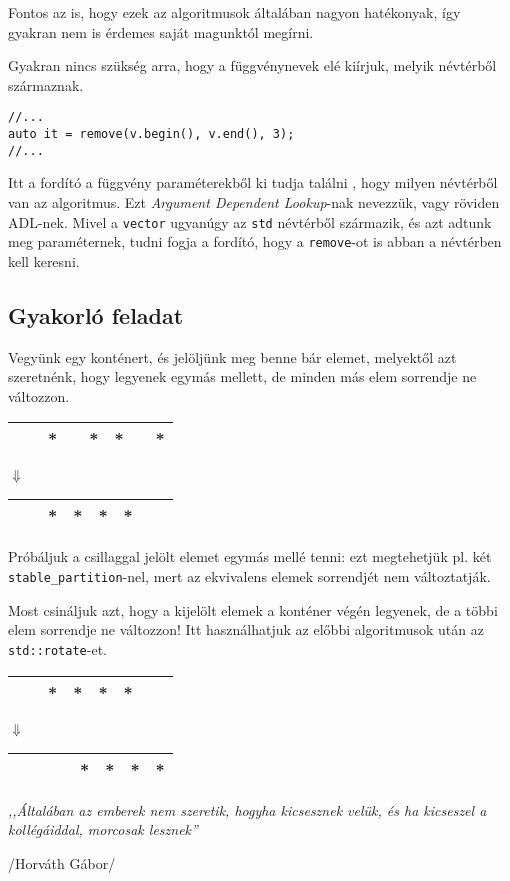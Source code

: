 \documentclass[a4paper,11.5pt,table]{article}
\begin{document}
	Fontos az is, hogy ezek az algoritmusok általában nagyon hatékonyak, így gyakran nem is érdemes saját magunktól megírni.
	
	\medskip
	Gyakran nincs szükség arra, hogy a függvénynevek elé kiírjuk, melyik névtérből származnak.
	\begin{lstlisting}
//...
auto it = remove(v.begin(), v.end(), 3);
//...
	\end{lstlisting}
	Itt a fordító a függvény paraméterekből ki tudja találni , hogy milyen névtérből van az algoritmus. Ezt \textit{Argument Dependent Lookup}-nak nevezzük, vagy röviden ADL-nek. Mivel a \texttt{vector} ugyanúgy az \texttt{std} névtérből származik, és azt adtunk meg paraméternek, tudni fogja a fordító, hogy a \texttt{remove}-ot is abban a névtérben kell keresni.
	
	\subsection{Gyakorló feladat}
	
	Vegyünk egy konténert, és jelöljünk meg benne bár elemet, melyektől azt szeretnénk, hogy legyenek egymás mellett, de minden más elem sorrendje ne változzon.
	\begin{center}
		\begin{tabular}{|c|c|c|c|c|c|c|c|}
			\hline
			&&*&&*&*&&*\\
			\hline
		\end{tabular}
		
		$\Downarrow$
		
		\begin{tabular}{|c|c|c|c|c|c|c|c|}
			\hline
			&&*&*&*&*&&\\
			\hline
		\end{tabular}
	\end{center}
	Próbáljuk a csillaggal jelölt elemet egymás mellé tenni: ezt megtehetjük pl. két \texttt{stable\_partition}-nel, mert az ekvivalens elemek sorrendjét nem változtatják. 
	
	Most csináljuk azt, hogy a kijelölt elemek a konténer végén legyenek, de a többi elem sorrendje ne változzon! Itt használhatjuk az előbbi algoritmusok után az \texttt{std::rotate}-et.
	\begin{center}
		
		\begin{tabular}{|c|c|c|c|c|c|c|c|}
			\hline
			&&*&*&*&*&&\\
			\hline
		\end{tabular}
		
		$\Downarrow$
		
		\begin{tabular}{|c|c|c|c|c|c|c|c|}
			\hline
			&&&&*&*&*&*\\
			\hline
		\end{tabular}
	\end{center}
	\begin{center}
		\textit{,,Általában az emberek nem szeretik, hogyha kicsesznek velük, és ha kicseszel a kollégáiddal, morcosak lesznek''}
		
		/Horváth Gábor/
	\end{center}
\end{document}

